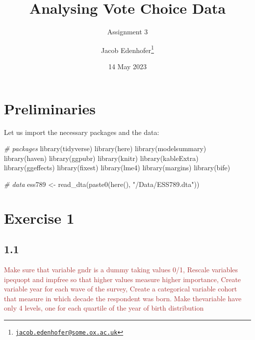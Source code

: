 \documentclass[
]{article}
\title{Analysing Vote Choice Data}
\subtitle{Assignment 3}
\author{Jacob Edenhofer\footnote{\href{mailto:jacob.edenhofer@some.ox.ac.uk}{\nolinkurl{jacob.edenhofer@some.ox.ac.uk}}}}
\date{14 May 2023}
\newenvironment{Shaded}{\begin{snugshade}}{\end{snugshade}}
\newcommand{\CommentTok}[1]{\textcolor[rgb]{0.56,0.35,0.01}{\textit{#1}}}
\newcommand{\FunctionTok}[1]{\textcolor[rgb]{0.00,0.00,0.00}{#1}}
\newcommand{\NormalTok}[1]{#1}
\newcommand{\OtherTok}[1]{\textcolor[rgb]{0.56,0.35,0.01}{#1}}
\newcommand{\StringTok}[1]{\textcolor[rgb]{0.31,0.60,0.02}{#1}}
\begin{document}
\maketitle

\hypertarget{preliminaries}{%
\section{Preliminaries}\label{preliminaries}}

Let us import the necessary packages and the data:

\begin{Shaded}
\begin{Highlighting}[]
\CommentTok{\# packages }
\FunctionTok{library}\NormalTok{(tidyverse)}
\FunctionTok{library}\NormalTok{(here)}
\FunctionTok{library}\NormalTok{(modelsummary)}
\FunctionTok{library}\NormalTok{(haven)}
\FunctionTok{library}\NormalTok{(ggpubr)}
\FunctionTok{library}\NormalTok{(knitr)}
\FunctionTok{library}\NormalTok{(kableExtra)}
\FunctionTok{library}\NormalTok{(ggeffects)}
\FunctionTok{library}\NormalTok{(fixest)}
\FunctionTok{library}\NormalTok{(lme4)}
\FunctionTok{library}\NormalTok{(margins)}
\FunctionTok{library}\NormalTok{(bife)}

\CommentTok{\# data}
\NormalTok{ess789 }\OtherTok{\textless{}{-}} \FunctionTok{read\_dta}\NormalTok{(}\FunctionTok{paste0}\NormalTok{(}\FunctionTok{here}\NormalTok{(), }\StringTok{"/Data/ESS789.dta"}\NormalTok{))}
\end{Highlighting}
\end{Shaded}

\hypertarget{exercise-1}{%
\section{Exercise 1}\label{exercise-1}}

\hypertarget{section}{%
\subsection{1.1}\label{section}}

\textcolor{brown}{Make sure that variable gndr is a dummy taking values 0/1, Rescale variables ipequopt and impfree so that higher values measure higher importance, Create variable year for each wave of the survey, Create a categorical variable cohort that measure in which decade the respondent was born. Make thevariable have only 4 levels, one for each quartile of the year of birth distribution}
\end{document}
